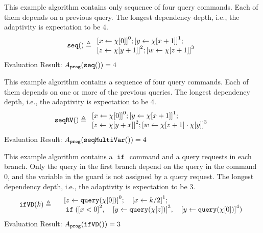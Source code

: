     \begin{example}
        \label{ex:seq}
        This example algorithm contains only sequence of four query commands.
        Each of them depends on a previous query.
        The longest dependency depth, i.e., the adaptivity is expectation to be $4$.
        \[
            \kw{seq()} \triangleq 
        \begin{array}{l} 
               \clabel{ \assign{x}{\chi[0]}}^{0} ; 
   \clabel{\assign{y}{\chi[x + 1]} }^{1} ; \\
   \clabel{\assign{z}{\chi[y + 1]}}^{2}; 
    \clabel{\assign{w}{\chi[z + 1]} }^{3}
            \end{array}
        \]
        Evaluation Result: $ A_{\mathtt{prog}}( \mathtt{seq()}) = 4$
        \end{example}
    \begin{example}
        \label{ex:seqRV}
        This example algorithm contains a sequence of four query commands.
        Each of them depends on one or more of the previous queries.
        The longest dependency depth, i.e., the adaptivity is expectation to be $4$.
        \[
            \kw{seqRV()} \triangleq 
        \begin{array}{l} 
               \clabel{ \assign{x}{\chi[0]}}^{0} ;
   \clabel{\assign{y}{\chi[x + 1]} }^{1} ; \\
   \clabel{\assign{z}{\chi[y + x]}}^{2}; 
    \clabel{\assign{w}{\chi[z + 1] \cdot \chi[y]} }^{3}
            \end{array}
        \]
        Evaluation Result: $ A_{\mathtt{prog}}(\mathtt{seqMultiVar()}) = 4$
    \end{example}
        \begin{example}
            \label{ex:ifVD}
            This example algorithm contains a $\;\mathtt{if}\;$ command and a query requests
            in each branch.
            Only the query in the first branch depend on the query in the command $0$,
            and the variable in the guard is not assigned by a query request.
            The longest dependency depth, i.e., the adaptivity is expectation to be $3$.
            \[
            \kw{ifVD}(k) \triangleq 
            \begin{array}{l}
               \quad \clabel{ \assign{z}{\query(\chi[0])}}^{0} ; 
               \quad \clabel{\assign{x}{k / 2} }^{1} ; \\
               \quad \eif(\clabel{x < 0}^2,
               \quad \clabel{\assign{y}{\query(\chi[z])}}^{3},
               \quad \clabel{\assign{y}{\query(\chi[0])}}^{4})
   \end{array}
            \]
            Evaluation Result: $ A_{\mathtt{prog}}( \mathtt{ifVD()}) = 3$
        \end{example}
    
